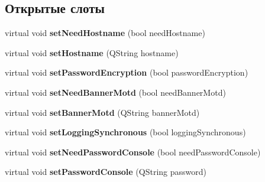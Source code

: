 \subsection*{Открытые слоты}
\begin{DoxyCompactItemize}
\item 
virtual void {\bfseries set\+Need\+Hostname} (bool need\+Hostname)\hypertarget{class_network_equipment_form_aa4f27acc75a23ad6217c73d1993d0376}{}\label{class_network_equipment_form_aa4f27acc75a23ad6217c73d1993d0376}

\item 
virtual void {\bfseries set\+Hostname} (Q\+String hostname)\hypertarget{class_network_equipment_form_a1752541512a46670f6febf6b72cf5982}{}\label{class_network_equipment_form_a1752541512a46670f6febf6b72cf5982}

\item 
virtual void {\bfseries set\+Password\+Encryption} (bool password\+Encryption)\hypertarget{class_network_equipment_form_a0d9eb5989eb412d6280932312e9b20ac}{}\label{class_network_equipment_form_a0d9eb5989eb412d6280932312e9b20ac}

\item 
virtual void {\bfseries set\+Need\+Banner\+Motd} (bool need\+Banner\+Motd)\hypertarget{class_network_equipment_form_a2afda0d1433c5d628a64fdd8257c3eea}{}\label{class_network_equipment_form_a2afda0d1433c5d628a64fdd8257c3eea}

\item 
virtual void {\bfseries set\+Banner\+Motd} (Q\+String banner\+Motd)\hypertarget{class_network_equipment_form_a79f90ee6080427b546440919fda03a63}{}\label{class_network_equipment_form_a79f90ee6080427b546440919fda03a63}

\item 
virtual void {\bfseries set\+Logging\+Synchronous} (bool logging\+Synchronous)\hypertarget{class_network_equipment_form_a648fbcdd8f69b64eab22da3ebb1f962f}{}\label{class_network_equipment_form_a648fbcdd8f69b64eab22da3ebb1f962f}

\item 
virtual void {\bfseries set\+Need\+Password\+Console} (bool need\+Password\+Console)\hypertarget{class_network_equipment_form_a47fbe2df13e3571ee14f74b40e0ee85c}{}\label{class_network_equipment_form_a47fbe2df13e3571ee14f74b40e0ee85c}

\item 
virtual void {\bfseries set\+Password\+Console} (Q\+String password)\hypertarget{class_network_equipment_form_a433f72d8df210acf7a77fcb96da9cd1b}{}\label{class_network_equipment_form_a433f72d8df210acf7a77fcb96da9cd1b}


\end{DoxyCompactItemize}
